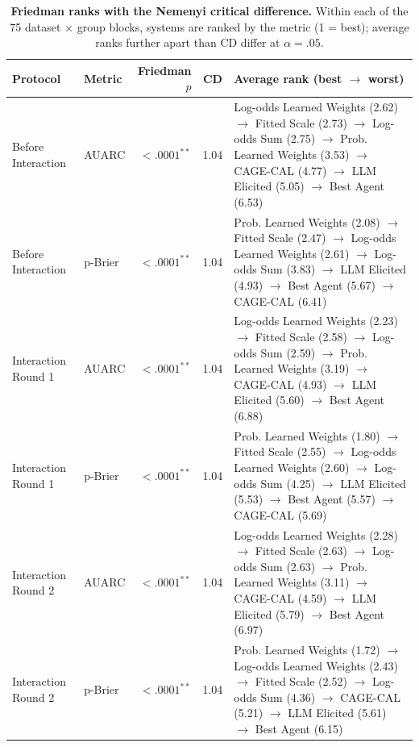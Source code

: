 \begin{table}[t]
\centering
\small
\begin{tabular}{llrcp{}}
\toprule
Protocol & Metric & Friedman $p$ & CD & Average rank (best $\to$ worst) \\
\midrule
Before Interaction & AUARC & $<.0001^{**}$ & 1.04 & Log-odds Learned Weights (2.62) $\to$ Fitted Scale (2.73) $\to$ Log-odds Sum (2.75) $\to$ Prob. Learned Weights (3.53) $\to$ CAGE-CAL (4.77) $\to$ LLM Elicited (5.05) $\to$ Best Agent (6.53) \\
Before Interaction & p-Brier & $<.0001^{**}$ & 1.04 & Prob. Learned Weights (2.08) $\to$ Fitted Scale (2.47) $\to$ Log-odds Learned Weights (2.61) $\to$ Log-odds Sum (3.83) $\to$ LLM Elicited (4.93) $\to$ Best Agent (5.67) $\to$ CAGE-CAL (6.41) \\
Interaction Round 1 & AUARC & $<.0001^{**}$ & 1.04 & Log-odds Learned Weights (2.23) $\to$ Fitted Scale (2.58) $\to$ Log-odds Sum (2.59) $\to$ Prob. Learned Weights (3.19) $\to$ CAGE-CAL (4.93) $\to$ LLM Elicited (5.60) $\to$ Best Agent (6.88) \\
Interaction Round 1 & p-Brier & $<.0001^{**}$ & 1.04 & Prob. Learned Weights (1.80) $\to$ Fitted Scale (2.55) $\to$ Log-odds Learned Weights (2.60) $\to$ Log-odds Sum (4.25) $\to$ LLM Elicited (5.53) $\to$ Best Agent (5.57) $\to$ CAGE-CAL (5.69) \\
Interaction Round 2 & AUARC & $<.0001^{**}$ & 1.04 & Log-odds Learned Weights (2.28) $\to$ Fitted Scale (2.63) $\to$ Log-odds Sum (2.63) $\to$ Prob. Learned Weights (3.11) $\to$ CAGE-CAL (4.59) $\to$ LLM Elicited (5.79) $\to$ Best Agent (6.97) \\
Interaction Round 2 & p-Brier & $<.0001^{**}$ & 1.04 & Prob. Learned Weights (1.72) $\to$ Log-odds Learned Weights (2.43) $\to$ Fitted Scale (2.52) $\to$ Log-odds Sum (4.36) $\to$ CAGE-CAL (5.21) $\to$ LLM Elicited (5.61) $\to$ Best Agent (6.15) \\
\bottomrule
\end{tabular}
\caption{\textbf{Friedman ranks with the Nemenyi critical difference.} Within each of the 75 dataset $\times$ group blocks, systems are ranked by the metric (1 = best); average ranks further apart than CD differ at $\alpha = .05$.}
\label{tab:rankings}
\end{table}
